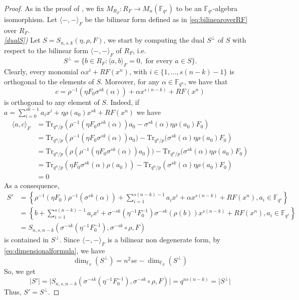 \documentclass[10pt,a4paper]{amsart}
\newcommand{\F}{{\mathbb F}}
\newcommand{\Tr}{{\mathrm{Tr}}}
\begin{document}
\begin{proof}
As in the proof of , we fix $M_{R_F}:R_F \rightarrow M_n(\F_{q^s})$ to be an $\F_{q^s}$-algebra isomorphism. Let $\langle -, - \rangle_F$ be the bilinear form defined as in \eqref{eq:bilinearoverRF} over $R_F$. \\
\emph{\ref{dualS})}  Let $S=S_{n,s,k}(\eta,\rho,F)$, we start by computing the dual $S^{\perp}$ of $S$ with respect to the bilinear form $\langle -,- \rangle_F$ of $R_F$, i.e. 
\[
S^{\perp}=\{b \in R_F \colon \langle a,b \rangle_F=0, \mbox{ for every }a \in S\}.
\]
Clearly, every monomial $\alpha x^i+RF(x^n)$, with $i \in \{1,\ldots,s(n-k)-1\}$ is orthogonal to the elements of $S$. Moreover, for any $\alpha \in \F_{q^n}$, we have that \[c = \rho^{-1}(\eta F_0\sigma^{sk}(\alpha))+\alpha x^{s(n-k)}+RF(x^n)\] is orthogonal to any element of $S$. Indeed, if $a=\sum_{i=0}^{sk-1}a_ix^i+\eta \rho(a_0)x^{sk} + RF(x^n)$ we have 
\[
\begin{split}
\langle a, c \rangle_F &= \Tr_{q^n/p}\left( \rho^{-1}(\eta F_0\sigma^{sk}(\alpha))a_0-\sigma^{sk}(\alpha) \eta \rho(a_0)F_0  \right) \\
&= \Tr_{q^n/p}\left( \rho^{-1}(\eta F_0\sigma^{sk}(\alpha))a_0)-\Tr_{q^n/p}(\sigma^{sk}(\alpha) \eta \rho(a_0)F_0  \right) \\ 
&= \Tr_{q^n/p}\left(\rho( \rho^{-1}(\eta F_0\sigma^{sk}(\alpha))a_0))-\Tr_{q^n/p}(\sigma^{sk}(\alpha) \eta \rho(a_0)F_0  \right)  \\
&= \Tr_{q^n/p}\left( \eta F_0\sigma^{sk}(\alpha)\rho(a_0)\right) - \Tr_{q^n/p}\left(\sigma^{sk}(\alpha)  \eta \rho(a_0)  F_0 \right) \\
&= 0
\end{split}
\]
As a consequence, \[
\begin{split}
S' &= \left\{\rho^{-1}(\eta F_0)\rho^{-1}(\sigma^{sk}(\alpha))+\sum\limits_{i=1}^{s(n-k)-1}a_ix^i+\alpha x^{s(n-k)}+RF(x^n), a_i \in \F_{q^s}\right\}\\
&= \left\{b+\sum\limits_{i=1}^{s(n-k)-1}a_ix^i+\sigma^{-sk}(\eta^{-1}F_0^{-1}) \sigma^{-sk}(\rho(b)) x^{s(n-k)}+RF(x^n), a_i \in \F_{q^s}\right\} \\
&= S_{n,s,n-k}(\sigma^{-sk}(\eta^{-1}F_0^{-1}), \sigma^{-sk} \circ \rho,F)
\end{split}
\]
is contained in $S^{\perp}$. Since $\langle -,- \rangle_F$ is a bilinear non degenerate  form, by \eqref{eq:dimensionalformula}, we have  \[
\dim_{\F_p}(S^{\perp})=n^2se-\dim_{\F_p}(S^{\perp})
\]
So, we get
\[
\lvert S' \rvert= \lvert S_{n,s,n-k}(\sigma^{-sk}(\eta^{-1}F_0^{-1}), \sigma^{-sk} \circ \rho,F) \rvert=q^{ns(n-k)}=\lvert S^{\perp} \rvert
\]
Thus, $S'=S^{\perp}$.


\end{proof}
\end{document}
